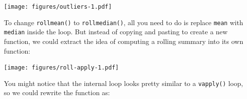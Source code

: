 \begin{Shaded}
\begin{Highlighting}[]
\StringTok{ }\NormalTok{(}\NormalTok{, }\NormalTok{, } \NormalTok{) +}\StringTok{ }\NormalTok{(}\NormalTok{, } \NormalTok{) /}\StringTok{ }
\NormalTok{(}\NormalTok{), } \NormalTok{, } \NormalTok{)}
\end{Highlighting}
\end{Shaded}

\clearpage
\texttt{[image: figures/outliers-1.pdf]}

To change \texttt{rollmean()} to \texttt{rollmedian()}, all you need to
do is replace \texttt{mean} with \texttt{median} inside the loop. But
instead of copying and pasting to create a new function, we could
extract the idea of computing a rolling summary into its own function:

\begin{Shaded}
\begin{Highlighting}[]
\StringTok{ }
  \StringTok{ }\NormalTok{(}\NormalTok{, }

  \StringTok{ }\StringTok{ }\NormalTok{)}
  \StringTok{ }\NormalTok{):(}\StringTok{ }\StringTok{ }\StringTok{ }\NormalTok{)) \{}
    \StringTok{ }\NormalTok{(x[(i -}\StringTok{ }\StringTok{ }\NormalTok{offset)], ...)}
  \NormalTok{\}}
\NormalTok{\}}
\NormalTok{(} \NormalTok{, } \NormalTok{)}
\end{Highlighting}
\end{Shaded}

\texttt{[image: figures/roll-apply-1.pdf]}

You might notice that the internal loop looks pretty similar to a
\texttt{vapply()} loop, so we could rewrite the function as:

